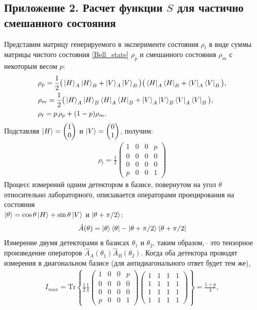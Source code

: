 \documentclass[12pt,a5paper]{article}
\numberwithin{equation}{section}
\begin{document}
\subsection{Приложение 2. Расчет функции $S$ для частично смешанного состояния}\label{app_S_real}
Представим матрицу генерируемого в эксперименте состояния $\rho_t$ в виде суммы матрицы чистого состояния \ref{Bell_state} $\rho_p$ и смешанного состояния $\rho_m$ с некоторым весом $p$:
\begin{gather}
\begin{split}
    &\rho_p=\frac{1}{2}\big(\ket{H}_A\ket{H}_B+\ket{V}_A\ket{V}_B\big)\big(\bra{H}_A\bra{H}_B+\bra{V}_A\bra{V}_B\big), \\
    &\rho_m=\frac{1}{2}\big(\ket{H}_A\ket{H}_B\bra{H}_A\bra{H}_B+\ket{V}_A\ket{V}_B\bra{V}_A\bra{V}_B\big), \\
    &\rho_t=p\,\rho_p+(1-p)\rho_m.
\end{split}
\label{rho_1}
\end{gather}
Подставляя $\ket{H}=\left(\begin{matrix} 1\\0 \end{matrix}\right)$ и $\ket{V}=\left(\begin{matrix} 0\\1 \end{matrix}\right)$, получим:
\begin{gather}
    \rho_t=\frac{1}{2} \left(\begin{matrix} 1&0&0&p\\0&0&0&0\\0&0&0&0\\p&0&0&1 \end{matrix}\right)
\label{rho_2}
\end{gather}
Процесс измерений одним детектором в базисе, повернутом на угол $\theta$ относительно лабораторного, описывается операторами проецирования на состояния \\ $\ket{\theta}= \cos\theta \ket{H}+\sin\theta\ket{V}$ и $\ket{\theta+\pi/2}$:
\begin{gather}
    \hat{A}({\theta})=\ket{\theta}\bra{\theta}-\ket{\theta+\pi/2}\bra{\theta+\pi/2}
\label{A}
\end{gather}
Измерение двумя детекторами в базисах $\theta_1$ и $\theta_2$, таким образом,-- это тензорное произведение операторов $\hat{A}_A({\theta_1})\hat{A}_B({\theta_2})$.
Когда оба детектора проводят измерения в диагональном базисе (для антидиагонального ответ будет тем же),
\begin{gather}
    I_{max}=\mbox{Tr}\left\{\frac{1}{2} \frac{1}{4}
    \left(\begin{matrix} 1&0&0&p\\0&0&0&0\\0&0&0&0\\p&0&0&1 \end{matrix}\right)
    \left(\begin{matrix} 1&1&1&1\\1&1&1&1\\1&1&1&1\\1&1&1&1 \end{matrix}\right)\right\}=
    \frac{1+p}{4},
\label{I_max}
\end{gather}
\end{document}
